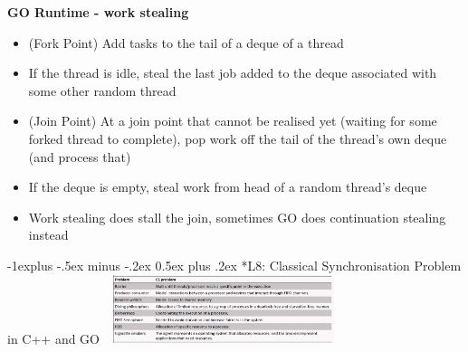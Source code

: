 \documentclass[10pt, landscape]{article}
\makeatletter
\renewcommand{\subsection}{\@startsection{subsection}{2}{0mm}%
                                {-1explus -.5ex minus -.2ex}%
                                {0.5ex plus .2ex}%
                                {\normalfont\normalsize\bfseries}}
\makeatother
\begin{document}
\begin{multicols}{4}
\textbf{GO Runtime - work stealing } \\ 
\begin{itemize}
    \item (Fork Point) Add tasks to the tail of a deque of a thread 
    \item If the thread is idle, steal the last job added to the deque associated with some other random thread 
    \item (Join Point) At a join point that cannot be realised yet (waiting for some forked thread to complete), pop work off the tail of the thread's own deque (and process that)
    \item If the deque is empty, steal work from head of a random thread's deque
    \item Work stealing does stall the join, sometimes GO does continuation stealing instead
\end{itemize}

\subsection*{L8: Classical Synchronisation Problem in C++ and GO}
\includegraphics*[width = 7cm, height = 2cm]{classicalSummary.png} \\


\end{multicols}
\end{document}
